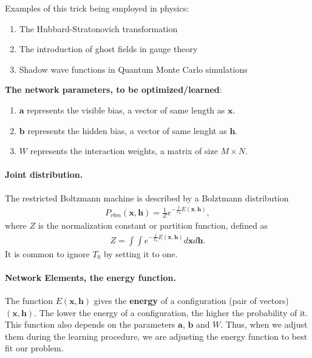 \documentclass[%
oneside,                 %
final,                   %
10pt]{article}
\begin{document}
Examples of this trick being employed in physics: 
\begin{enumerate}
 \item The Hubbard-Stratonovich transformation

 \item The introduction of ghost fields in gauge theory

 \item Shadow wave functions in Quantum Monte Carlo simulations
\end{enumerate}

\noindent
\textbf{The network parameters, to be optimized/learned}:
\begin{enumerate}
 \item $\mathbf{a}$ represents the visible bias, a vector of same length as $\mathbf{x}$.

 \item $\mathbf{b}$ represents the hidden bias, a vector of same lenght as $\mathbf{h}$.

 \item $W$ represents the interaction weights, a matrix of size $M\times N$.
\end{enumerate}

\noindent
\paragraph{Joint distribution.}
The restricted Boltzmann machine is described by a Bolztmann distribution
\begin{align}
	P_{rbm}(\mathbf{x},\mathbf{h}) = \frac{1}{Z} e^{-\frac{1}{T_0}E(\mathbf{x},\mathbf{h})},
\end{align}
where $Z$ is the normalization constant or partition function, defined as 
\begin{align}
	Z = \int \int e^{-\frac{1}{T_0}E(\mathbf{x},\mathbf{h})} d\mathbf{x} d\mathbf{h}.
\end{align}
It is common to ignore $T_0$ by setting it to one. 

\paragraph{Network Elements, the energy function.}
The function $E(\mathbf{x},\mathbf{h})$ gives the \textbf{energy} of a
configuration (pair of vectors) $(\mathbf{x}, \mathbf{h})$. The lower
the energy of a configuration, the higher the probability of it. This
function also depends on the parameters $\mathbf{a}$, $\mathbf{b}$ and
$W$. Thus, when we adjust them during the learning procedure, we are
adjusting the energy function to best fit our problem.
\end{document}

